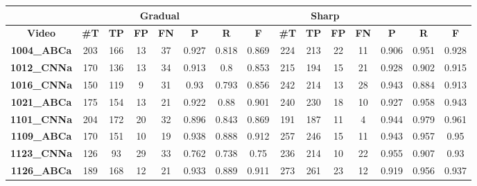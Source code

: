 \documentclass[journal]{IEEEtran}
\begin{document}
\begin{table*}[h]
\centering

\begin{tabular}{|c|c|c|c|c|c|c|c|c|c|c|c|c|c|c|}
\hline
 & \multicolumn{6}{c|}{\textbf{Gradual}} & \multicolumn{6}{c|}{\textbf{Sharp}}  \\ \hline
\textbf{Video}      & \textbf{\#T} & \textbf{TP} & \textbf{FP} & \textbf{FN} & \textbf{P} & \textbf{R} & \textbf{F} & \textbf{\#T} & \textbf{TP} & \textbf{FP} & \textbf{FN} & \textbf{P} & \textbf{R} & \textbf{F} \\ \hline
\textbf{1004\_ABCa} & 203           & 166         & 13          & 37          & 0.927      & 0.818      & 0.869      & 224           & 213         & 22          & 11          & 0.906      & 0.951      & 0.928      \\ \hline
\textbf{1012\_CNNa} & 170           & 136         & 13          & 34          & 0.913      & 0.8        & 0.853      & 215           & 194         & 15          & 21          & 0.928      & 0.902      & 0.915      \\ \hline
\textbf{1016\_CNNa} & 150           & 119         & 9           & 31          & 0.93       & 0.793      & 0.856      & 242           & 214         & 13          & 28          & 0.943      & 0.884      & 0.913      \\ \hline
\textbf{1021\_ABCa} & 175           & 154         & 13          & 21          & 0.922      & 0.88       & 0.901      & 240           & 230         & 18          & 10          & 0.927      & 0.958      & 0.943      \\ \hline
\textbf{1101\_CNNa} & 204           & 172         & 20          & 32          & 0.896      & 0.843      & 0.869      & 191           & 187         & 11          & 4           & 0.944      & 0.979      & 0.961      \\ \hline
\textbf{1109\_ABCa} & 170           & 151         & 10          & 19          & 0.938      & 0.888      & 0.912      & 257           & 246         & 15          & 11          & 0.943      & 0.957      & 0.95       \\ \hline
\textbf{1123\_CNNa} & 126           & 93          & 29          & 33          & 0.762      & 0.738      & 0.75       & 236           & 214         & 10          & 22          & 0.955      & 0.907      & 0.93       \\ \hline
\textbf{1126\_ABCa} & 189           & 168         & 12          & 21          & 0.933      & 0.889      & 0.911      & 273           & 261         & 23          & 12          & 0.919      & 0.956      & 0.937      \\ \hline

\end{tabular}
\end{table*}
\end{document}

